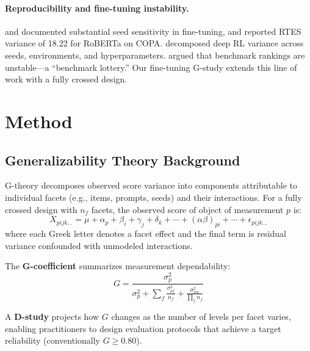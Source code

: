 \documentclass[11pt,letterpaper]{article}
\begin{document}
\paragraph{Reproducibility and fine-tuning instability.}
\citet{dodge2020finetuning} and \citet{sellam2022multibertsmultibert} documented substantial seed sensitivity in fine-tuning, and \citet{bui2025} reported RTES variance of 18.22 for RoBERTa on COPA. \citet{henderson2018deep} decomposed deep RL variance across seeds, environments, and hyperparameters. \citet{dehghani2021benchmark} argued that benchmark rankings are unstable---a ``benchmark lottery.'' Our fine-tuning G-study extends this line of work with a fully crossed design.

\section{Method}

\subsection{Generalizability Theory Background}

G-theory \citep{shavelson1991generalizability,brennan2001generalizability} decomposes observed score variance into components attributable to individual facets (e.g., items, prompts, seeds) and their interactions. For a fully crossed design with $n_f$ facets, the observed score of object of measurement $p$ is:
\begin{equation}
X_{pijk\ldots} = \mu + \alpha_p + \beta_i + \gamma_j + \delta_k + \cdots + (\alpha\beta)_{pi} + \cdots + \epsilon_{pijk\ldots}
\end{equation}
where each Greek letter denotes a facet effect and the final term is residual variance confounded with unmodeled interactions.

The \textbf{G-coefficient} summarizes measurement dependability:
\begin{equation}
G = \frac{\sigma^2_p}{\sigma^2_p + \sum_{f} \frac{\sigma^2_{pf}}{n_f} + \frac{\sigma^2_{\text{res}}}{\prod_f n_f}}
\end{equation}

A \textbf{D-study} projects how $G$ changes as the number of levels per facet varies, enabling practitioners to design evaluation protocols that achieve a target reliability (conventionally $G \geq 0.80$).
\end{document}
